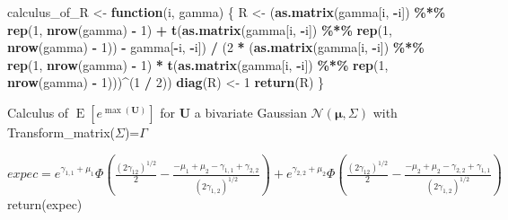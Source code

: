 \documentclass[
]{article}
\newenvironment{Shaded}{\begin{snugshade}}{\end{snugshade}}
\newcommand{\ControlFlowTok}[1]{\textcolor[rgb]{0.13,0.29,0.53}{\textbf{#1}}}
\newcommand{\DecValTok}[1]{\textcolor[rgb]{0.00,0.00,0.81}{#1}}
\newcommand{\FunctionTok}[1]{\textcolor[rgb]{0.13,0.29,0.53}{\textbf{#1}}}
\newcommand{\NormalTok}[1]{#1}
\newcommand{\OtherTok}[1]{\textcolor[rgb]{0.56,0.35,0.01}{#1}}
\newcommand{\SpecialCharTok}[1]{\textcolor[rgb]{0.81,0.36,0.00}{\textbf{#1}}}
\begin{document}
\begin{Shaded}
\begin{Highlighting}[]
\NormalTok{calculus\_of\_R }\OtherTok{\textless{}{-}} \ControlFlowTok{function}\NormalTok{(i, gamma) \{}
\NormalTok{  R }\OtherTok{\textless{}{-}}\NormalTok{ (}\FunctionTok{as.matrix}\NormalTok{(gamma[i, }\SpecialCharTok{{-}}\NormalTok{i]) }\SpecialCharTok{\%*\%} \FunctionTok{rep}\NormalTok{(}\DecValTok{1}\NormalTok{, }\FunctionTok{nrow}\NormalTok{(gamma) }\SpecialCharTok{{-}} \DecValTok{1}\NormalTok{) }\SpecialCharTok{+} \FunctionTok{t}\NormalTok{(}\FunctionTok{as.matrix}\NormalTok{(gamma[i, }\SpecialCharTok{{-}}\NormalTok{i]) }\SpecialCharTok{\%*\%} \FunctionTok{rep}\NormalTok{(}\DecValTok{1}\NormalTok{, }\FunctionTok{nrow}\NormalTok{(gamma) }\SpecialCharTok{{-}} \DecValTok{1}\NormalTok{)) }\SpecialCharTok{{-}}\NormalTok{ gamma[}\SpecialCharTok{{-}}\NormalTok{i, }\SpecialCharTok{{-}}\NormalTok{i]) }\SpecialCharTok{/}\NormalTok{ (}\DecValTok{2} \SpecialCharTok{*}\NormalTok{ (}\FunctionTok{as.matrix}\NormalTok{(gamma[i, }\SpecialCharTok{{-}}\NormalTok{i]) }\SpecialCharTok{\%*\%} \FunctionTok{rep}\NormalTok{(}\DecValTok{1}\NormalTok{, }\FunctionTok{nrow}\NormalTok{(gamma) }\SpecialCharTok{{-}} \DecValTok{1}\NormalTok{) }\SpecialCharTok{*} \FunctionTok{t}\NormalTok{(}\FunctionTok{as.matrix}\NormalTok{(gamma[i, }\SpecialCharTok{{-}}\NormalTok{i]) }\SpecialCharTok{\%*\%} \FunctionTok{rep}\NormalTok{(}\DecValTok{1}\NormalTok{, }\FunctionTok{nrow}\NormalTok{(gamma) }\SpecialCharTok{{-}} \DecValTok{1}\NormalTok{)))}\SpecialCharTok{\^{}}\NormalTok{(}\DecValTok{1} \SpecialCharTok{/} \DecValTok{2}\NormalTok{))}
  \FunctionTok{diag}\NormalTok{(R) }\OtherTok{\textless{}{-}} \DecValTok{1}
  \FunctionTok{return}\NormalTok{(R)}
\NormalTok{\}}
\end{Highlighting}
\end{Shaded}

\begin{algorithm}[H]
\caption{ Calculus of $\operatorname{E}[e^{\max(\boldsymbol{U})}]$ for $\boldsymbol{U}$ a bivariate Gaussian $\mathcal{N}(\boldsymbol{\mu},\Sigma)$ with Transform\_matrix($\Sigma$)=$\Gamma$}\label{alg:cap}
\begin{algorithmic}[1]
  
\State $expec=e^{\gamma_{1,1}+\mu_1}\Phi\left( \tfrac{(2\gamma_{12})^{1/2}}{2}-\tfrac{-\mu_1+\mu_2-\gamma_{1,1}+\gamma_{2,2}}{(2 \gamma_{1,2})^{1/2}}\right)+ e^{\gamma_{2,2}+\mu_2}\Phi\left( \tfrac{(2\gamma_{12})^{1/2}}{2}-\tfrac{-\mu_2+\mu_2-\gamma_{2,2}+\gamma_{1,1}}{(2 \gamma_{1,2})^{1/2}}\right) $
\State return(expec)
\EndFunction
\end{algorithmic}
\end{algorithm}
\end{document}
